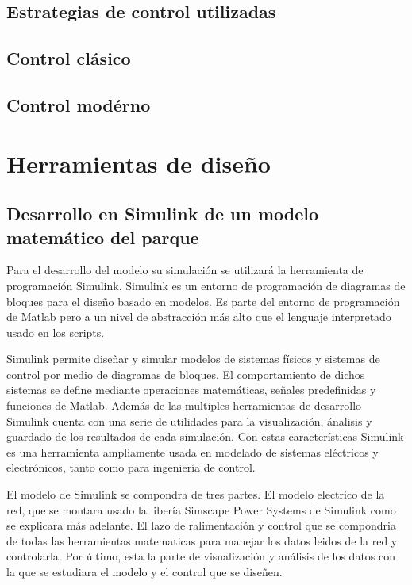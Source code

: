 \documentclass{book}
\begin{document}
	\section{Estrategias de control utilizadas}

	\section{Control cl\'asico}

	\section{Control mod\'erno}

\chapter{Herramientas de diseño}


	\section{Desarrollo en Simulink de un modelo matem\'atico del parque}

Para el desarrollo del modelo su simulaci\'on se utilizar\'a la herramienta de programaci\'on Simulink. Simulink es un entorno de programaci\'on de diagramas de bloques para el diseño basado en modelos. Es parte del entorno de programaci\'on de Matlab pero a un nivel de abstracci\'on m\'as alto que el lenguaje interpretado usado en los scripts. \par

Simulink permite diseñar y simular modelos de sistemas f\'isicos y sistemas de control por medio de diagramas de bloques. El comportamiento de dichos sistemas se define mediante operaciones matem\'aticas, señales predefinidas y funciones de Matlab. Adem\'as de las multiples herramientas de desarrollo Simulink cuenta con una serie de utilidades para la visualizaci\'on, \'analisis y guardado de los resultados de cada simulaci\'on. Con estas caracter\'isticas Simulink es una herramienta ampliamente usada en modelado de sistemas el\'ectricos y electr\'onicos, tanto como para ingenier\'ia de control. \par

El modelo de Simulink se compondra de tres partes. El modelo electrico de la red, que se montara usado la liber\'ia Simscape Power Systems de Simulink como se explicara m\'as adelante. El lazo de ralimentaci\'on y control que se compondria de todas las herramientas matematicas para manejar los datos leidos de la red y controlarla. Por \'ultimo, esta la parte de visualizaci\'on y an\'alisis de los datos con la que se estudiara el modelo y el control que se diseñen.   \par
\end{document}
